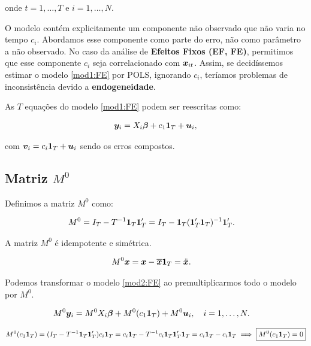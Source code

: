 \documentclass[11pt, oneside, a4paper, article]{article}
\numberwithin{equation}{section}
\begin{document}
\noindent
onde
$t = 1, \dots, T$ e $i = 1, \dots, N$.

O modelo contém explicitamente um componente não observado que não varia no tempo $c_{i}$.
Abordamos esse componente como parte do erro, não como parâmetro a não observado.
No caso da análise de \textbf{Efeitos Fixos (EF, FE)}, permitimos que esse componente $c_{i}$ seja correlacionado com $\boldsymbol{x}_{it}$.
Assim, se decidíssemos estimar o modelo \eqref{mod1:FE} por POLS, ignorando $c_{i}$, teríamos problemas de inconsistência devido a \textbf{endogeneidade}.

As $T$ equações do modelo \eqref{mod1:FE} podem ser reescritas como:

\vspace{-1 em}
\begin{align} \label{mod2:FE}
	\boldsymbol{y}_{i} = X_{i} \boldsymbol{\beta} + c_{1} \boldsymbol{1}_{T} + \boldsymbol{u}_{i},
\end{align}

\noindent
com
$\boldsymbol{v}_{i} = c_{i} \boldsymbol{1}_{T} + \boldsymbol{u}_{i}$ sendo os erros compostos.

\subsection*{Matriz $M^{0}$}

Definimos a matriz $M^{0}$ como:

\vspace{-1 em}
\begin{align*}
	M^{0} &=
	I_{T} - T^{-1} \boldsymbol{1}_{T} \boldsymbol{1}_{T}'
	=
	I_{T} - \boldsymbol{1}_{T} (\boldsymbol{1}_{T}' \boldsymbol{1}_{T})^{-1} \boldsymbol{1}_{T}'.
\end{align*}

\noindent
A matriz $M^{0}$ é idempotente e simétrica.

\begin{align*}
	M^{0} \boldsymbol{x} &= \boldsymbol{x} - \overline{\boldsymbol{x}} \boldsymbol{1}_{T}
	= \ddot{\boldsymbol{x}}.
\end{align*}

Podemos transformar o modelo \eqref{mod2:FE} ao premultiplicarmos todo o modelo por $M^{0}$.

\vspace{-1 em}
\begin{align*} 
M^{0} \boldsymbol{y}_{i} &= M^{0} X_{i} \boldsymbol{\beta} + M^{0} ( c_{1} \boldsymbol{1}_{T} ) + M^{0} \boldsymbol{u}_{i},
\quad i = 1, \dots, N.
\end{align*}

\vspace{-1 em}
\begin{align*} 
M^{0} ( c_{1} \boldsymbol{1}_{T} ) = 
( I_{T} - T^{-1} \boldsymbol{1}_{T} \boldsymbol{1}_{T}' ) c_{i} \boldsymbol{1}_{T} 
=
c_{i} \boldsymbol{1}_{T} - T^{-1} c_{i} \boldsymbol{1}_{T} \boldsymbol{1}_{T}' \boldsymbol{1}_{T} 
=
c_{i} \boldsymbol{1}_{T} - c_{i} \boldsymbol{1}_{T} 
\implies
\boxed{ M^{0} ( c_{1} \boldsymbol{1}_{T} ) = 0 }
\end{align*}
\end{document}
